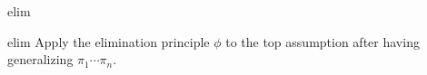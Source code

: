 \begin{tactic}{elim}
  \begin{tsyntax}[empty]{elim}
  Apply the elimination principle $\phi$ to the top assumption after
  having generalizing $\pi_1 \cdots \pi_n$.
  \end{tsyntax}
\end{tactic}
